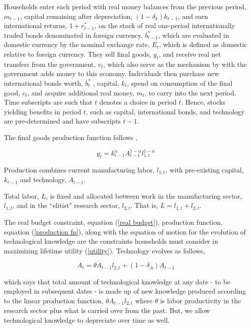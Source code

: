\documentclass{OUP-EJ}
\begin{document}
Households enter each period with real money balances from the previous period, $m_{t-1}$, capital remaining after depreciation, $(1-\delta_k)k_{t-1}$, and earn international returns, $1+r^*_{t-1}$, on the stock of real one-period internationally traded bonds denominated in foreign currency, $b^*_{t-1}$, which are evaluated in domestic currency by the nominal exchange rate, $E_t$, which is defined as domestic relative to foreign currency. They sell final goods, $y_t$, and receive real net transfers from the government, $v_t$, which also serve as the mechanism by with the government adds money to this economy.  Individuals then purchase new international bonds worth, $b^*_t$ , capital, $k_t$, spend on consumption of the final good, $c_t$, and acquire additional real money, $m_t$, to carry into the next period. Time subscripts are such that $t$ denotes a choice in period $t$.  Hence, stocks yielding benefits in period $t$, such as capital, international bonds, and technology are pre-determined and have subscripts $t-1$.

The final goods production function follows \cite{Romer1990}, 

\begin{equation}
    \label{production fn}
    y_t = k_{t-1}^{\alpha}A_{t-1}^{1-\alpha}l_{1,t}^{1-\alpha} 
\end{equation}

Production combines current manufacturing labor, $l_{1,t}$, with pre-existing capital, $k_{t-1}$ and technology, $A_{t-1}$.

Total labor, $L$, is fixed and allocated between work in the manufacturing sector, $l_{1,t}$, and in the ``elitist" research sector, $l_{2,t}$.  That is, $L=l_{1,t}+l_{2,t}$.

The real budget constraint, equation (\ref{real budget}), production function, equation (\ref{production fn}), along with the equation of motion for the evolution of technological knowledge are the constraints households must consider in maximizing lifetime utility (\ref{utility}).  Technology evolves as follows,

\begin{equation}
    \label{tech accum}
    A_t=\theta A_{t-1} l_{2,t}+(1-\delta_A) A_{t-1}
\end{equation}

which says that total amount of technological knowledge at any date - to be employed in subsequent dates - is made up of new knowledge produced according to the linear production function, $\theta A_{t-1} l_{2,t}$ where $\theta$ is labor productivity in the research sector plus what is carried over from the past. But, we allow technological knowledge to depreciate over time as well.
\end{document}
